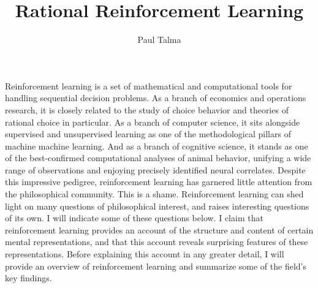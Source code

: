 \documentclass{phil-paper}
\title{Rational Reinforcement Learning}
\author{Paul Talma}
\begin{document}
Reinforcement learning is a set of mathematical and computational tools for handling sequential decision problems.
As a branch of economics and operations research, it is closely related to the study of choice behavior and theories of rational choice in particular.
As a branch of computer science, it sits alongside supervised and unsupervised learning as one of the methodological pillars of machine machine learning.
And as a branch of  cognitive science, it stands as one of the best-confirmed computational analyses of animal behavior, unifying a wide range of observations and enjoying precisely identified neural correlates.
Despite this impressive pedigree, reinforcement learning has garnered little attention from the philosophical community.
This is a shame.
Reinforcement learning can shed light on many questions of philosophical interest, and raises interesting questions of its own.
I will indicate some of these questions below.
I claim that reinforcement learning provides an account of the structure and content of certain mental representations, and that this account reveals surprising features of these representations.
Before explaining this account in any greater detail, I will provide an overview of reinforcement learning and summarize some of the field's key findings.



% 

% 

% 





	
\end{document}
